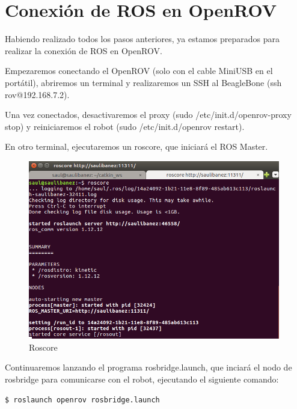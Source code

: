 \section{Conexión de ROS en OpenROV}
\label{cap:Conexion de ROS en OpenROV}

Habiendo realizado todos los pasos anteriores, ya estamos preparados para realizar la conexión de ROS en OpenROV.

Empezaremos conectando el OpenROV (solo con el cable MiniUSB en el portátil), abriremos un terminal y realizaremos un SSH al BeagleBone (ssh rov@192.168.7.2).

Una vez conectados, desactivaremos el proxy (sudo /etc/init.d/openrov-proxy stop) y reiniciaremos el robot (sudo /etc/init.d/openrov restart).

En otro terminal, ejecutaremos un roscore, que iniciará el ROS Master.

\begin{figure} [hbtp]
  \begin{center}
    \includegraphics[width=11cm]{img/cap4/roscore}
  \end{center}
  \caption{Roscore}
  \label{fig:roscore}
\end{figure}
\newpage

Continuaremos lanzando el programa rosbridge.launch, que inciará el nodo de rosbridge para comunicarse con el robot, ejecutando el siguiente comando:

\begin{lstlisting}[caption=launch, label={lst:launch}]
	$ roslaunch openrov rosbridge.launch
\end{lstlisting}

